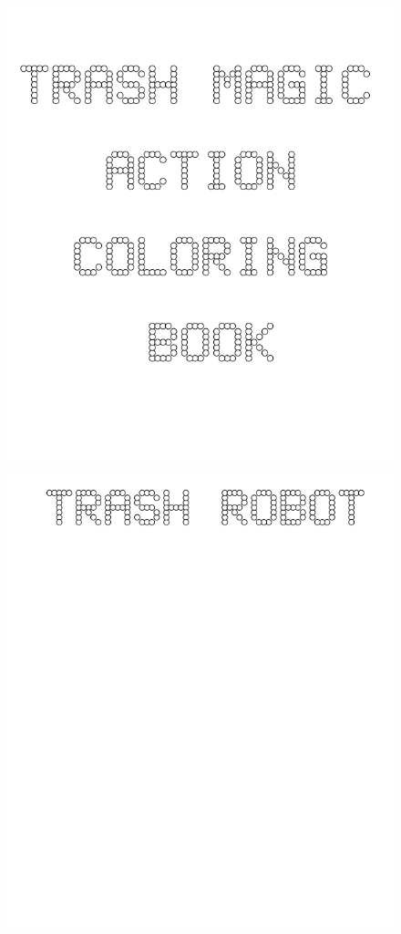 \documentclass[17pt]{extreport}
\begin{document}
	

        \begin{figure}
		\centering
		\includegraphics[width=6.25in]{imageserver/uploadimages/cover.png}
	\end{figure}	
        \begin{figure}
		\centering
		\includegraphics[width=6.25in]{imageserver/uploadimages/trashrobot.png}
	\end{figure}	
\end{document}
